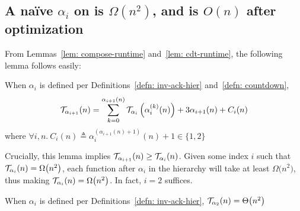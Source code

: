 \subsection{A na\"ive $\alpha_i$ on  is $\Omega(n^2)$, and is $O(n)$ after optimization} \label{sect: hardcode-lvl2}

\noindent From Lemmas~\ref{lem: compose-runtime} and~\ref{lem: cdt-runtime}, the following lemma follows easily:
\begin{lem} \label{lem: inv-ack-hier-runtime}
	When $\alpha_i$ is defined per Definitions~\ref{defn: inv-ack-hier} 
	and~\ref{defn: countdown},
	\begin{equation*}
	\mathcal{T}_{\alpha_{i+1}}(n) = \sum_{k=0}^{\alpha_{i+1}(n)}\mathcal{T}_{\alpha_i}\left( \alpha_i^{(k)}(n)\right) + 3\alpha_{i+1}(n) + C_i(n)
	\end{equation*}
	\hspace{7em}where $\forall i, n.~C_i(n) \triangleq \alpha_i^{(\alpha_{i+1}(n) + 1)}(n) + 1 \in \{1, 2\}$
\end{lem}
Crucially, this lemma implies $\mathcal{T}_{\alpha_{i+1}}(n) \ge 
\mathcal{T}_{\alpha_i}(n)$. 
Given some index $i$ such that \linebreak $\mathcal{T}_{\alpha_i}(n) = \Omega\big(n^2\big)$, each function after $\alpha_i$ in the hierarchy will take at least $\Omega\big(n^2\big)$, thus making $\mathcal{T}_{\alpha_i} (n) = \Omega\big(n^2\big)$.
In fact, $i = 2$ suffices.
\begin{lem} \label{lem:runtimealpha2}
	When $\alpha_i$ is defined per Definitions~\ref{defn: inv-ack-hier}, $\mathcal{T}_{\alpha_2}(n) = \Theta\big(n^2\big)$
\end{lem}


